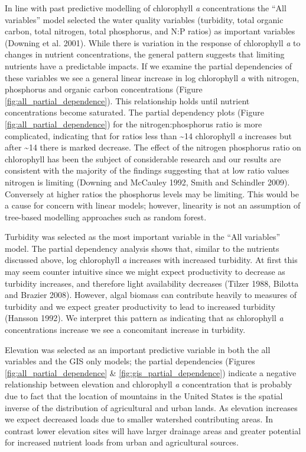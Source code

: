 \documentclass[12pt,]{article}
\begin{document}
In line with past predictive modelling of chlorophyll \emph{a}
concentrations the ``All variables'' model selected the water quality
variables (turbidity, total organic carbon, total nitrogen, total
phosphorus, and N:P ratios) as important variables (Downing et al.
2001). While there is variation in the response of chlorophyll \emph{a}
to changes in nutrient concentrations, the general pattern suggests that
limiting nutrients have a predictable impacts. If we examine the partial
dependencies of these variables we see a general linear increase in log
chlorophyll \emph{a} with nitrogen, phosphorus and organic carbon
concentrations (Figure \ref{fig:all_partial_dependence}). This
relationship holds until nutrient concentrations become saturated. The
partial dependency plots (Figure \ref{fig:all_partial_dependence}) for
the nitrogen:phosphorus ratio is more complicated, indicating that for
ratios less than \textasciitilde{}14 chlorophyll \emph{a} increases but
after \textasciitilde{}14 there is marked decrease. The effect of the
nitrogen phosphorus ratio on chlorophyll has been the subject of
considerable research and our results are consistent with the majority
of the findings suggesting that at low ratio values nitrogen is limiting
(Downing and McCauley 1992, Smith and Schindler 2009). Conversely at
higher ratios the phosphorus levels may be limiting. This would be a
cause for concern with linear models; however, linearity is not an
assumption of tree-based modelling approaches such as random forest.

Turbidity was selected as the most important variable in the ``All
variables'' model. The partial dependency analysis shows that, similar
to the nutrients discussed above, log chlorophyll \emph{a} increases
with increased turbidity. At first this may seem counter intuitive since
we might expect productivity to decrease as turbidity increases, and
therefore light availability decreases (Tilzer 1988, Bilotta and Brazier
2008). However, algal biomass can contribute heavily to measures of
turbidity and we expect greater productivity to lead to increased
turbidity (Hansson 1992). We interpret this pattern as indicating that
as chlorophyll \emph{a} concentrations increase we see a concomitant
increase in turbidity.

Elevation was selected as an important predictive variable in both the
all variables and the GIS only models; the partial dependencies (Figures
\ref{fig:all_partial_dependence} \& \ref{fig:gis_partial_dependence})
indicate a negative relationship between elevation and chlorophyll
\emph{a} concentration that is probably due to fact that the location of
mountains in the United States is the spatial inverse of the
distribution of agricultural and urban lands. As elevation increases we
expect decreased loads due to smaller watershed contributing areas. In
contrast lower elevation sites will have larger drainage areas and
greater potential for increased nutrient loads from urban and
agricultural sources.
\end{document}
